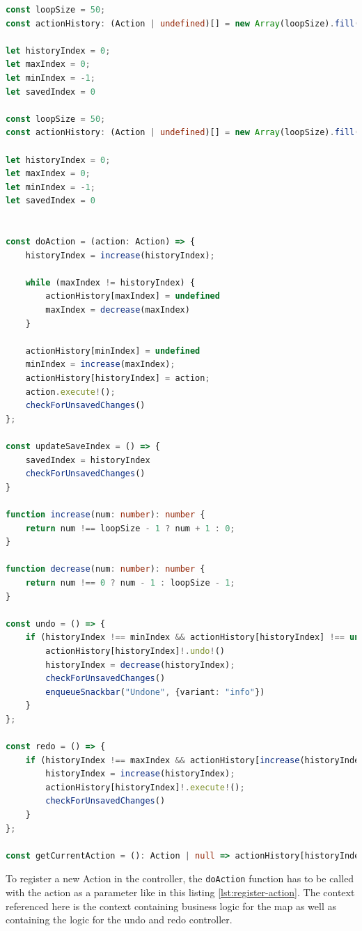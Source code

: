 \begin{lstlisting}[language=TypeScript,caption={Action controller implementation},label={lst:action-controller}]
const loopSize = 50;
const actionHistory: (Action | undefined)[] = new Array(loopSize).fill(undefined);

let historyIndex = 0;
let maxIndex = 0;
let minIndex = -1;
let savedIndex = 0

const loopSize = 50;
const actionHistory: (Action | undefined)[] = new Array(loopSize).fill(undefined);

let historyIndex = 0;
let maxIndex = 0;
let minIndex = -1;
let savedIndex = 0


const doAction = (action: Action) => {
    historyIndex = increase(historyIndex);

    while (maxIndex != historyIndex) {
        actionHistory[maxIndex] = undefined
        maxIndex = decrease(maxIndex)
    }

    actionHistory[minIndex] = undefined
    minIndex = increase(maxIndex);
    actionHistory[historyIndex] = action;
    action.execute!();
    checkForUnsavedChanges()
};

const updateSaveIndex = () => {
    savedIndex = historyIndex
    checkForUnsavedChanges()
}

function increase(num: number): number {
    return num !== loopSize - 1 ? num + 1 : 0;
}

function decrease(num: number): number {
    return num !== 0 ? num - 1 : loopSize - 1;
}

const undo = () => {
    if (historyIndex !== minIndex && actionHistory[historyIndex] !== undefined) {
        actionHistory[historyIndex]!.undo!()
        historyIndex = decrease(historyIndex);
        checkForUnsavedChanges()
        enqueueSnackbar("Undone", {variant: "info"})
    }
};

const redo = () => {
    if (historyIndex !== maxIndex && actionHistory[increase(historyIndex)] !== undefined) {
        historyIndex = increase(historyIndex);
        actionHistory[historyIndex]!.execute!();
        checkForUnsavedChanges()
    }
};

const getCurrentAction = (): Action | null => actionHistory[historyIndex] ?? null;
\end{lstlisting}

To register a new Action in the controller, the \texttt{doAction} function has to be called with the action as a parameter like in this listing \ref{lst:register-action}. The context referenced here is the context containing business logic for the map as well as containing the logic for the undo and redo controller.

